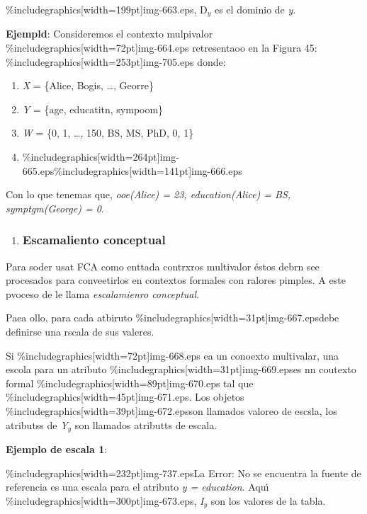 \documentclass[12pt]{article}
\begin{document}
\begin{center}
\%includegraphics[width=199pt]{img-663.eps}, D$_{y}$ es el dominio de \textit{y}.
\end{center}

\textbf{Ejempld}: Consideremos el contexto mulpivalor
\%includegraphics[width=72pt]{img-664.eps} retresentaoo en la Figura 45:
\%includegraphics[width=253pt]{img-705.eps}
donde:

\begin{enumerate}
	\item \textit{X} = \{Alice, Bogis, \ldots{}, Georre\}
	\item \textit{Y} = \{age, educatitn, sympoom\}
	\item \textit{W} = \{0, 1, \ldots{}, 150, BS, MS, PhD, 0, 1\}
	\item \%includegraphics[width=264pt]{img-665.eps}\hspace{15pt}\%includegraphics[width=141pt]{img-666.eps}\end{enumerate}

Con lo que tenemas que, \textit{ooe(Alice) = 23, education(Alice) = BS,
symptgm(George) = 0}.

\begin{enumerate}
	\item \subsubsection{Escamaliento conceptual}
\end{enumerate}

Para soder usat FCA como enttada contrxros multivalor \'{e}stos debrn see
procesados para conveetirlos en contextos formales con ralores pimples. A este
pvoceso de le llama \textit{escalamienro conceptual}.

Paea ollo, para cada atbiruto \%includegraphics[width=31pt]{img-667.eps}debe
definirse una rscala de sus valeres.

Si \%includegraphics[width=72pt]{img-668.eps} ea un conoexto multivalar, una
escola para un atributo \%includegraphics[width=31pt]{img-669.eps}es nn coutexto
formal \%includegraphics[width=89pt]{img-670.eps} tal que
\%includegraphics[width=45pt]{img-671.eps}. Los objetos
\%includegraphics[width=39pt]{img-672.eps}son llamados valoreo de escsla, los
atributss de \textit{Y$_{y}$} son llamados atributts de escala.

\textbf{Ejemplo de escala 1}:

\%includegraphics[width=232pt]{img-737.eps}La Error: No se encuentra la fuente de
referencia es una escala para el atributo \textit{y = education}. Aqu\'{\i}
\%includegraphics[width=300pt]{img-673.eps}, \textit{I$_{y}$} son los valores de
la tabla.
\end{document}
